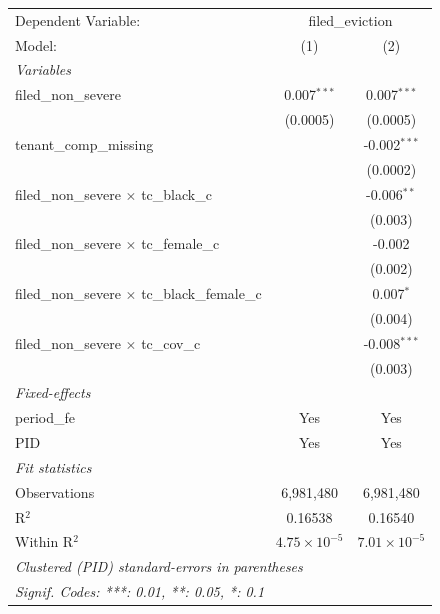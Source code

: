 \par\endgroup
\begingroup
\centering
\begin{tabular}{lcc}
   \tabularnewline \midrule \midrule
   Dependent Variable: & \multicolumn{2}{c}{filed\_eviction}\\
   Model:                                                 & (1)                   & (2)\\  
   \midrule
   \emph{Variables}\\
   filed\_non\_severe                                     & 0.007$^{***}$         & 0.007$^{***}$\\   
                                                          & (0.0005)              & (0.0005)\\   
   tenant\_comp\_missing                                  &                       & -0.002$^{***}$\\   
                                                          &                       & (0.0002)\\   
   filed\_non\_severe $\times$ tc\_black\_c               &                       & -0.006$^{**}$\\   
                                                          &                       & (0.003)\\   
   filed\_non\_severe $\times$ tc\_female\_c              &                       & -0.002\\   
                                                          &                       & (0.002)\\   
   filed\_non\_severe $\times$ tc\_black\_female\_c       &                       & 0.007$^{*}$\\   
                                                          &                       & (0.004)\\   
   filed\_non\_severe $\times$ tc\_cov\_c                 &                       & -0.008$^{***}$\\   
                                                          &                       & (0.003)\\   
   \midrule
   \emph{Fixed-effects}\\
   period\_fe                                             & Yes                   & Yes\\  
   PID                                                    & Yes                   & Yes\\  
   \midrule
   \emph{Fit statistics}\\
   Observations                                           & 6,981,480             & 6,981,480\\  
   R$^2$                                                  & 0.16538               & 0.16540\\  
   Within R$^2$                                           & $4.75\times 10^{-5}$  & $7.01\times 10^{-5}$\\   
   \midrule \midrule
   \multicolumn{3}{l}{\emph{Clustered (PID) standard-errors in parentheses}}\\
   \multicolumn{3}{l}{\emph{Signif. Codes: ***: 0.01, **: 0.05, *: 0.1}}\\
\end{tabular}
